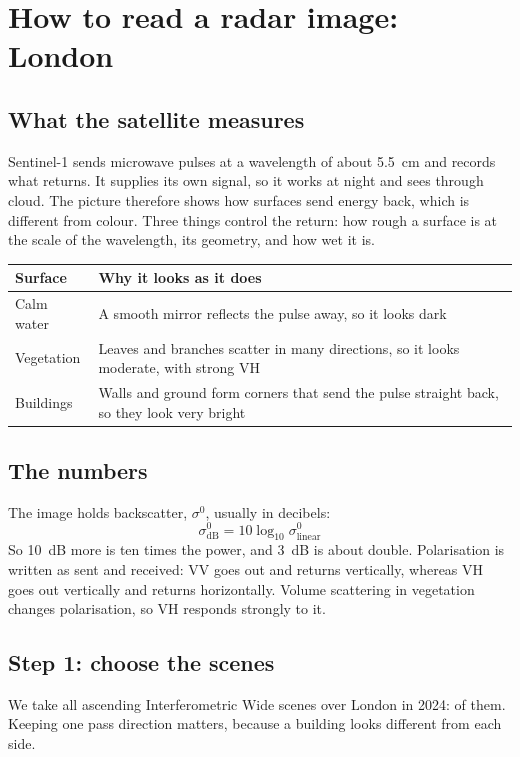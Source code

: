 \chapter{How to read a radar image: London}\label{sec:basics}

\section{What the satellite measures}
Sentinel-1 sends microwave pulses at a wavelength of about 5.5~cm and records what returns. It supplies its own signal, so it works at night and sees through cloud. The picture therefore shows how surfaces send energy back, which is different from colour. Three things control the return: how rough a surface is at the scale of the wavelength, its geometry, and how wet it is.

\begin{tabularx}{\linewidth}{@{}lX@{}}
\toprule
Surface & Why it looks as it does \\
\midrule
Calm water & A smooth mirror reflects the pulse away, so it looks dark \\
Vegetation & Leaves and branches scatter in many directions, so it looks moderate, with strong VH \\
Buildings & Walls and ground form corners that send the pulse straight back, so they look very bright \\
\bottomrule
\end{tabularx}

\section{The numbers}
The image holds backscatter, $\sigma^0$, usually in decibels:
\begin{equation}
\sigma^0_{\mathrm{dB}} = 10\log_{10}\sigma^0_{\mathrm{linear}}
\end{equation}
So 10~dB more is ten times the power, and 3~dB is about double. Polarisation is written as sent and received: VV goes out and returns vertically, whereas VH goes out vertically and returns horizontally. Volume scattering in vegetation changes polarisation, so VH responds strongly to it.

\section{Step 1: choose the scenes}
We take all ascending Interferometric Wide scenes over London in 2024: \nScenesLondon{} of them. Keeping one pass direction matters, because a building looks different from each side.


